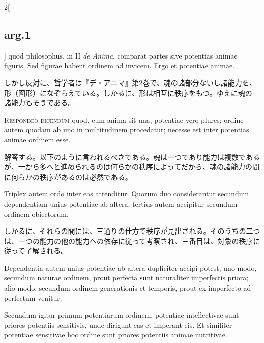 \documentclass[paper=a4paper,fontsize=10pt,jafontsize=9pt,titlepage]{jlreq}
\begin{document}
\begin{paracol}{2}[\subsection{arg.1}]
 quod philosophus, in II {\itshape de
 Anima}, comparat partes sive potentias animae figuris. Sed figurae
 habent ordinem ad invicem. Ergo et potentiae animae.

 
\switchcolumn

しかし反対に、哲学者は『デ・アニマ』第2巻で、魂の諸部分ないし諸能力を、
形（図形）になぞらえている。しかるに、形は相互に秩序をもつ。ゆえに魂の
諸能力もそうである。



 {\scshape Respondeo dicendum} quod, cum anima sit una, potentiae vero
 plures; ordine autem quodam ab uno in multitudinem procedatur;
 necesse est inter potentias animae ordinem esse.
 

\switchcolumn

解答する。以下のように言われるべきである。魂は一つであり能力は複数であるが、一から多へと進められるのは何らかの秩序によってだから、魂の諸能力の間に何らかの秩序があるのは必然である。

\switchcolumn*


Triplex autem ordo inter eas attenditur. Quorum duo considerantur secundum
dependentiam unius potentiae ab altera, tertius autem accipitur secundum ordinem
obiectorum.
 
\switchcolumn

  しかるに、それらの間には、三通りの仕方で秩序が見出される。そのうちの二つは、一つの能力の他の能力への依存に従って考察され、三番目は、対象の秩序に従って了解される。  

\switchcolumn*

 Dependentia autem unius potentiae ab altera dupliciter
 accipi potest, uno modo, secundum naturae ordinem, prout perfecta
 sunt naturaliter imperfectis priora; alio modo, secundum ordinem
 generationis et temporis, prout ex imperfecto ad perfectum
 venitur.
 
\switchcolumn



\switchcolumn*


 Secundum igitur primum potentiarum ordinem, potentiae
 intellectivae sunt priores potentiis sensitivis, unde dirigunt eas et
 imperant eis. Et similiter potentiae sensitivae hoc ordine sunt
 priores potentiis animae nutritivae.



\end{paracol}
\end{document}

